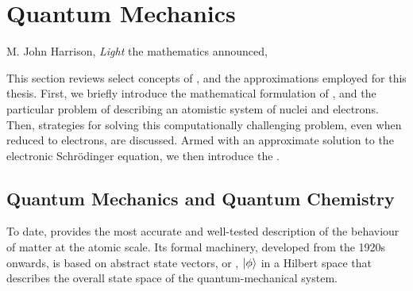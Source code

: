
\chapter{Quantum Mechanics}
\label{ch:qm}

\begin{chapquote}{M. John Harrison, \textit{Light}}
	 the mathematics announced, 
\end{chapquote}

\noindent
This section reviews select concepts of \qm, and the approximations employed for this thesis.
First, we briefly introduce the mathematical formulation of \qm, and the particular problem of describing an atomistic system of nuclei and electrons.
Then, strategies for solving this computationally challenging problem, even when reduced to electrons, are discussed. Armed with an approximate solution to the electronic Schrödinger equation, we then introduce the  .

\section{Quantum Mechanics and Quantum Chemistry}

To date, \qm provides the most accurate and well-tested description of the behaviour of matter at the atomic scale.
Its formal machinery, developed from the 1920s onwards, is based on abstract state vectors, or , $\ket{\phi}$ in a Hilbert space that describes the overall state space of the quantum-mechanical system.

